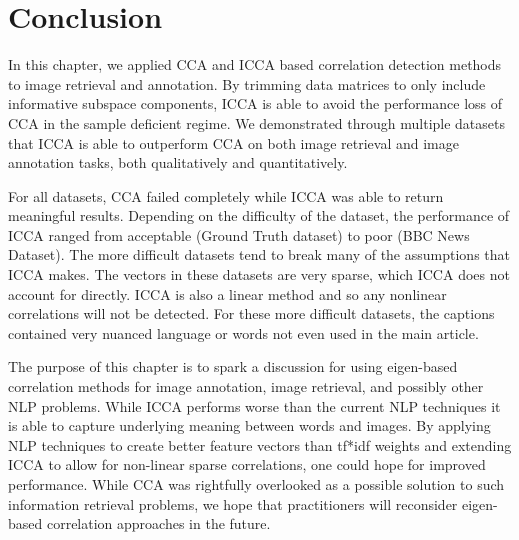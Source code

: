 \section{Conclusion}\label{sec:conc}

In this chapter, we applied CCA and ICCA based correlation detection methods to image
retrieval and annotation. By trimming data matrices to only include informative subspace
components, ICCA is able to avoid the performance loss of CCA in the sample deficient
regime. We demonstrated through multiple datasets that ICCA is able to outperform CCA on
both image retrieval and image annotation tasks, both qualitatively and
quantitatively. 

For all datasets, CCA failed completely while ICCA was able to return meaningful
results. Depending on the difficulty of the dataset, the performance of ICCA ranged from
acceptable (Ground Truth dataset) to poor (BBC News Dataset). The more difficult datasets
tend to break many of the assumptions that ICCA makes. The vectors in these datasets are very
sparse, which ICCA does not account for directly. ICCA is also a linear method and so any
nonlinear correlations will not be detected. For these more difficult datasets, the
captions contained very nuanced language or words not even used in the main article. 

The purpose of this chapter is to spark a discussion for using eigen-based correlation
methods for image annotation, image retrieval, and possibly other NLP
problems. While ICCA performs worse than the current NLP techniques it is able to capture
underlying meaning between words and images. By applying NLP techniques to create better
feature vectors than tf*idf weights and extending ICCA to allow for non-linear sparse
correlations, one could hope for improved performance. While CCA was rightfully overlooked
as a possible solution to such information retrieval problems, we hope that practitioners will
reconsider eigen-based correlation approaches in the future.

